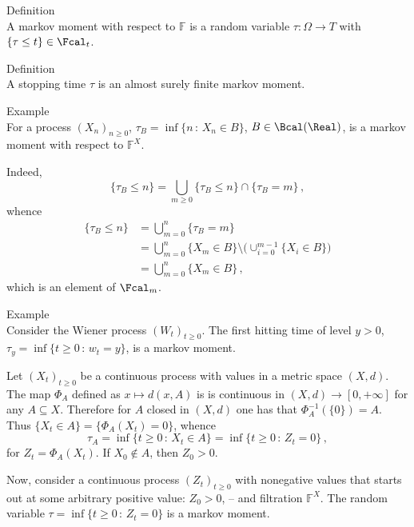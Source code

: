 \noindent Definition\hfill\\
A markov moment with respect to $\mathbb{F}$ is a random variable $\tau:\Omega\to T$
with $\{\tau \leq t\}\in \Fcal_t$.

\noindent Definition\hfill\\
A stopping time $\tau$ is an almost surely finite markov moment.

\noindent Example \hfill\\
For a process $(X_n)_{n\geq 0}$, $\tau_B = \inf\{n\,:\,X_n\in B\}$, $B\in \Bcal(\Real)$,
is a markov moment with respect to $\mathbb{F}^X$.

Indeed,
\[ \{\tau_B\leq n\} = \bigcup_{m\geq 0} \{ \tau_B\leq n \} \cap \{ \tau_B = m \} \,, \]
whence
\begin{align*}
	\{\tau_B\leq n\} &= \bigcup_{m=0}^n \{ \tau_B = m \}\\
		&= \bigcup_{m=0}^n \{ X_m\in B \} \setminus\bigl( \cup_{i=0}^{m-1} \{ X_i\in B \} \bigr)\\
		&= \bigcup_{m=0}^n \{ X_m\in B \} \,,
\end{align*}
which is an element of $\Fcal_m$.

\noindent Example \hfill\\
Consider the Wiener process $(W_t)_{t\geq 0}$. The first hitting time of level $y>0$,
$\tau_y=\inf\{t\geq 0\,:\,w_t = y\}$, is a markov moment.

Let $(X_t)_{t\geq0}$ be a continuous process with values in a metric space $(X,d)$.
The map $\Phi_A$ defined as $x\mapsto d(x,A)$ is is continuous in $(X,d)\to[0,+\infty]$
for any $A\subseteq X$. Therefore for $A$ closed in $(X,d)$ one has that
$\Phi_A^{-1}(\{0\})=A$. Thus $\{X_t\in A\} = \{\Phi_A(X_t) = 0\}$, whence
\[ \tau_A = \inf\{t\geq 0\,:\,X_t\in A\} = \inf\{t\geq 0\,:\,Z_t = 0\} \,, \]
for $Z_t = \Phi_A(X_t)$. If $X_0\notin A$, then $Z_0 > 0$.

Now, consider a continuous process $(Z_t)_{t\geq0}$ with nonegative values that
starts out at some arbitrary positive value: $Z_0>0$, -- and filtration $\mathbb{F}^X$. 
The random variable $\tau = \inf\{t\geq 0\,:\,Z_t = 0\}$ is a markov moment.

